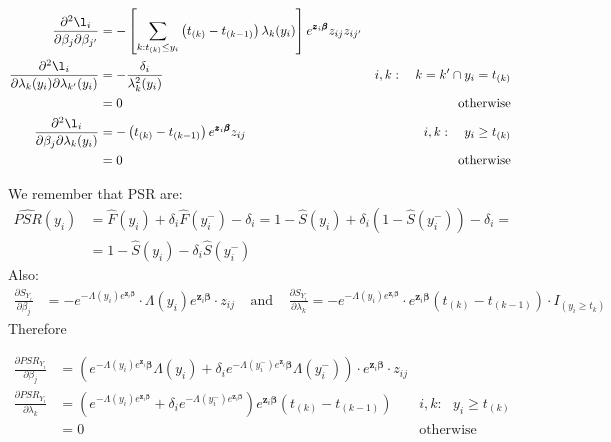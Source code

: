 \documentclass[]{article}
\begin{document}
$$
  \begin{aligned}
   \frac{\partial^2 \l_i}{\partial \beta_j \partial \beta_{j'}}  &= -\left[  \sum_{k: t_{(k)}\leq y_i} \left(t_{(k)} - t_{(k-1)}\right) \lambda_k(y_i)   \right]  e^{\pmb{z}_i\pmb{\beta}} z_{ij} z_{ij'}\\
    \frac{\partial^2 \l_i}{\partial \lambda_k(y_i)\partial \lambda_{k'}(y_i)}  &= -\frac{\delta_i}{\lambda_k^2(y_i)} ~~~~  &i,k:~~~k=k' \cap y_i=t_{(k)}\\
      &= 0~~~~  &\text{otherwise} \\
   \frac{\partial^2 \l_i}{\partial \beta_j \partial \lambda_k(y_i)}  &= -\left(  t_{(k)} - t_{(k-1)}  \right) e^{\pmb{z}_i\pmb{\beta}} z_{ij}~~~~  &i,k:~~~y_i \geq t_{(k)}\\
      &= 0 ~~~~  &\text{otherwise} \\
  \end{aligned}
$$


We remember that PSR are: 
  $$
  \begin{aligned}
    \widehat{PSR}(y_i) &= \hat{F}(y_i) + \delta_i \hat{F}(y_i^-) - \delta_i  = 1-\hat{S}(y_i) + \delta_i (1 - \hat{S}(y_i^-)) - \delta_i = \\
    & = 1-\hat{S}(y_i) - \delta_i \hat{S}(y_i^-)
  \end{aligned}
  $$
Also:
  $$
  \begin{aligned}
    \frac{\partial S_{Y_i}}{\partial \beta_j} & = -e^{-\Lambda(y_i)e^{\pmb{z}_i\pmb{\beta}}}\cdot \Lambda(y_i)e^{\pmb{z}_i\pmb{\beta}}  \cdot z_{ij} 
    ~~~~~\text{and}~~~~~ \frac{\partial S_{Y_i}}{\partial \lambda_k} =   -e^{-\Lambda(y_i)e^{\pmb{z}_i\pmb{\beta}}}\cdot e^{\pmb{z}_i\pmb{\beta}} (t_{(k)} - t_{(k-1)}) \cdot I_{(y_i \geq t_k)}
  \end{aligned}
  $$
Therefore

  $$
  \begin{aligned}
    \frac{\partial PSR_{Y_i}}{\partial \beta_j} & =   \left( e^{-\Lambda(y_i)e^{\pmb{z}_i}\pmb{\beta}}  \Lambda(y_i) + \delta_i e^{-\Lambda(y_i^-)e^{\pmb{z}_i}\pmb{\beta}}  \Lambda(y_i^-) \right) \cdot e^{\pmb{z}_i\pmb{\beta}}  \cdot z_{ij} \\
    \frac{\partial PSR_{Y_i}}{\partial \lambda_k} & = \left( e^{-\Lambda(y_i)e^{\pmb{z}_i\pmb{\beta}}}  + \delta_i e^{-\Lambda(y_i^-)e^{\pmb{z}_i\pmb{\beta}}} \right) e^{\pmb{z}_i\pmb{\beta}} (t_{(k)} - t_{(k-1)})  ~~~~  &i,k:~~~y_i \geq t_{(k)}\\
      &= 0 ~~~~  &\text{otherwise} \\
  \end{aligned}
  $$
  
\end{document}
